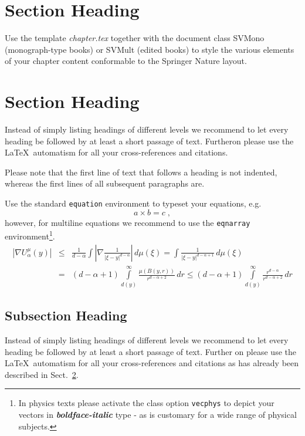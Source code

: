 \section{Section Heading}
\label{sec:1}
Use the template \emph{chapter.tex} together with the document class SVMono (monograph-type books) or SVMult (edited books) to style the various elements of your chapter content conformable to the Springer Nature layout.

\section{Section Heading}
\label{sec:2}
Instead of simply listing headings of different levels we recommend to let every heading be followed by at least a short passage of text. Furtheron please use the \LaTeX\ automatism for all your cross-references and citations.

Please note that the first line of text that follows a heading is not indented, whereas the first lines of all subsequent paragraphs are.

\eject

Use the standard \verb|equation| environment to typeset your equations, e.g.
%
\begin{equation}
a \times b = c\;,
\end{equation}
%
however, for multiline equations we recommend to use the \verb|eqnarray| environment\footnote{In physics texts please activate the class option \texttt{vecphys} to depict your vectors in \textbf{\itshape boldface-italic} type - as is customary for a wide range of physical subjects.}.
\begin{eqnarray}
\left|\nabla U_{\alpha}^{\mu}(y)\right| &\le&\frac1{d-\alpha}\int
\left|\nabla\frac1{|\xi-y|^{d-\alpha}}\right|\,d\mu(\xi) =
\int \frac1{|\xi-y|^{d-\alpha+1}} \,d\mu(\xi)\qquad  \\
&=&(d-\alpha+1) \int\limits_{d(y)}^\infty
\frac{\mu(B(y,r))}{r^{d-\alpha+2}}\,dr \le (d-\alpha+1)
\int\limits_{d(y)}^\infty \frac{r^{d-\alpha}}{r^{d-\alpha+2}}\,dr
\label{eq:01}
\end{eqnarray}

\enlargethispage{24pt}

\subsection{Subsection Heading}
\label{subsec:2}
Instead of simply listing headings of different levels we recommend to let every heading be followed by at least a short passage of text. Further on please use the \LaTeX\ automatism for all your cross-references and citations as has already been described in Sect.~\ref{sec:2}.

